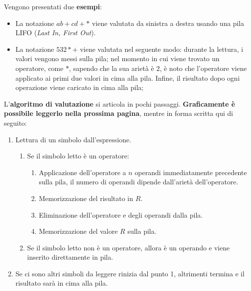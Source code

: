 \documentclass[a4paper]{article}
\begin{document}
	\noindent
	Vengono presentati due \textcolor{Green4}{\textbf{esempi}}:
	\begin{itemize}
		\item La notazione $ab+cd+*$ viene valutata da sinistra a destra usando una pila LIFO (\emph{Last In, First Out}).
		
		\item La notazione $532*+$ viene valutata nel seguente modo: durante la lettura, i valori vengono messi sulla pila; nel momento in cui viene trovato un operatore, come $*$, sapendo che la sua arietà è $2$, è noto che l'operatore viene applicato ai primi due valori in cima alla pila. Infine, il risultato dopo ogni operazione viene caricato in cima alla pila;
	\end{itemize}
	L'\textcolor{Red3}{\textbf{algoritmo di valutazione}} si articola in pochi passaggi. \textbf{Graficamente è possibile leggerlo nella prossima pagina}, mentre in forma scritta qui di seguito:
	\begin{enumerate}
		\item Lettura di un simbolo dall'espressione.
		
		\begin{enumerate}
			\item Se il simbolo letto è un operatore:
			\begin{enumerate}
				\item Applicazione dell'operatore a $n$ operandi immediatamente precedente sulla pila, il numero di operandi dipende dall'arietà dell'operatore.
				
				\item Memorizzazione del risultato in $R$.
				
				\item Eliminazione dell'operatore e degli operandi dalla pila.
				
				\item Memorizzazione del valore $R$ sulla pila.
			\end{enumerate}
			
			\item Se il simbolo letto non è un operatore, allora è un operando e viene inserito direttamente in pila.
		\end{enumerate}
		
		\item Se ci sono altri simboli da leggere rinizia dal punto 1, altrimenti termina e il risultato sarà in cima alla pila.
	\end{enumerate}\newpage
\end{document}
